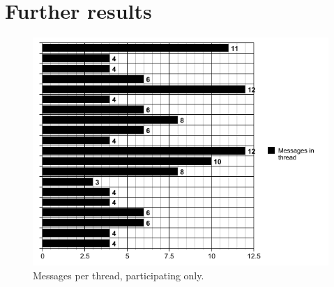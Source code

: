 \appendix
\chapter{Further results}
\begin{figure}[h]
\centering
\includegraphics[scale=0.80]{pics/distribution_of_messages.png}
\caption{Messages per thread, participating only.}
\end{figure}